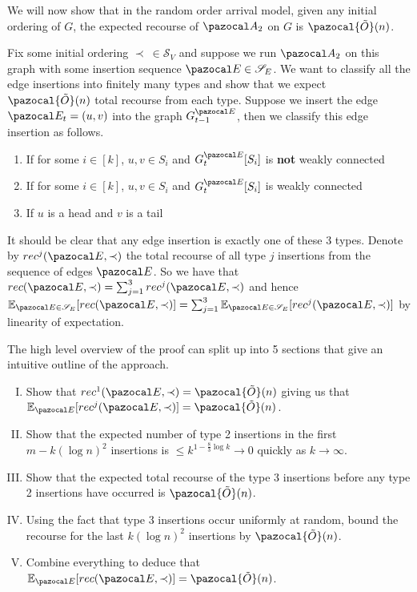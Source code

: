 \documentclass{report}
\begin{document}
We will now show that in the random order arrival model, given any initial ordering of $G$, the expected recourse of $\pazocal A_2$ on $G$ is $\pazocal {\tilde O}(n)$.

Fix some initial ordering $\prec \: \in \mathcal S_V$ and suppose we run $\pazocal A_2$ on this graph with some insertion sequence $\pazocal E \in \mathcal S_E$. We want to classify all the edge insertions into finitely many types and show that we expect $\pazocal{\tilde{O}}(n)$ total recourse from each type. Suppose we insert the edge $\pazocal E_t=(u,v)$ into the graph $G_{t-1}^{\pazocal E}$, then we classify this edge insertion as follows.

\begin{enumerate}[Type 1.]
    \item If for some $i \in [k]$, $u,v \in S_{i}$ and $G_{t}^{\pazocal E}[S_{i}]$ is \textbf{not} weakly connected
    \item If for some $i \in [k]$, $u,v \in S_{i}$ and $G_{t}^{\pazocal E}[S_{i}]$ is weakly connected
    \item If $u$ is a head and $v$ is a tail
\end{enumerate}

It should be clear that any edge insertion is exactly one of these 3 types. Denote by $rec^{j}(\pazocal E, \prec)$ the total recourse of all type $j$ insertions from the sequence of edges $\pazocal E$. So we have that $rec(\pazocal E, \prec) = \sum_{j=1}^{3}rec^{j}(\pazocal E, \prec)$ and hence $\mathbb{E}_{\pazocal E \in \mathcal S_E}[rec(\pazocal E, \prec)] = \sum_{j=1}^{3}\mathbb{E}_{\pazocal E \in \mathcal S_E}[rec^j(\pazocal E, \prec)]$ by linearity of expectation.

The high level overview of the proof can split up into 5 sections that give an intuitive outline of the approach.

\begin{enumerate}[I.]
    \item Show that $rec^{1}(\pazocal E, \prec)=\pazocal{\tilde{O}}(n)$ giving us that $\mathbb{E}_{\pazocal E}[rec^{j}(\pazocal E, \prec)]=\pazocal{\tilde{O}}(n)$.
    \item Show that the expected number of type 2 insertions in the first $m-k(\log n)^2$ insertions is $ \leq k^{1-\frac{8}{3}\log k} \rightarrow 0$ quickly as $k \rightarrow \infty$.
    \item Show that the expected total recourse of the type 3 insertions before any type 2 insertions have occurred is $\pazocal{\tilde{O}}(n)$.
    \item Using the fact that type 3 insertions occur uniformly at random, bound the recourse for the last $k(\log n)^2$ insertions by $\pazocal{\tilde{O}}(n) $.
    \item Combine everything to deduce that $\mathbb{E}_{\pazocal E}[rec(\pazocal E, \prec)]=\pazocal{\tilde{O}}(n)$.
\end{enumerate}
\end{document}

